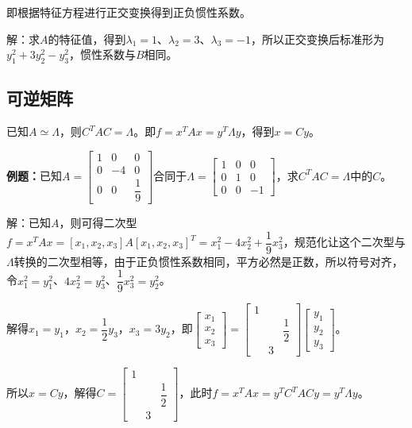 \documentclass[UTF8, 12pt]{ctexart}
\begin{document}
即根据特征方程进行正交变换得到正负惯性系数。

解：求$A$的特征值，得到$\lambda_1=1$、$\lambda_2=3$、$\lambda_3=-1$，所以正交变换后标准形为$y_1^2+3y_2^2-y_3^2$，惯性系数与$B$相同。

\subsection{可逆矩阵}

已知$A\simeq\Lambda$，则$C^TAC=\Lambda$。即$f=x^TAx=y^T\Lambda y$，得到$x=Cy$。

\textbf{例题：}已知$A=\left[\begin{array}{ccc}
    1 & 0 & 0 \\
    0 & -4 & 0 \\
    0 & 0 & \dfrac{1}{9}
\end{array}\right]$合同于$\Lambda=\left[\begin{array}{ccc}
    1 & 0 & 0 \\
    0 & 1 & 0 \\
    0 & 0 & -1
\end{array}\right]$，求$C^TAC=\Lambda$中的$C$。

解：已知$A$，则可得二次型$f=x^TAx=[x_1,x_2,x_3]A[x_1,x_2,x_3]^T=x_1^2-4x_2^2+\dfrac{1}{9}x_3^2$，规范化让这个二次型与$\Lambda$转换的二次型相等，由于正负惯性系数相同，平方必然是正数，所以符号对齐，令$x_1^2=y_1^2$、$4x_2^2=y_3^2$、$\dfrac{1}{9}x_3^2=y_2^2$。

解得$x_1=y_1$，$x_2=\dfrac{1}{2}y_3$，$x_3=3y_2$，即$\left[\begin{array}{c}
    x_1 \\
    x_2 \\
    x_3
\end{array}\right]=\left[\begin{array}{ccc}
    1 \\
    & & \dfrac{1}{2} \\
    & 3
\end{array}\right]\left[\begin{array}{c}
    y_1 \\
    y_2 \\
    y_3
\end{array}\right]$。

所以$x=Cy$，解得$C=\left[\begin{array}{ccc}
    1 \\
    & & \dfrac{1}{2} \\
    & 3
\end{array}\right]$，此时$f=x^TAx=y^TC^TACy=y^T\Lambda y$。
\end{document}
